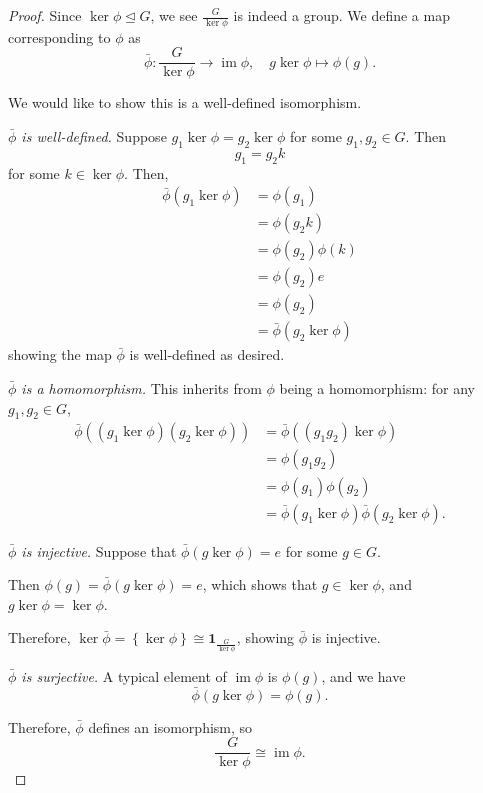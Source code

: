\documentclass{article}
\theoremstyle{definition}
\theoremstyle{remark}
\newcommand{\pqty}[1]{\left(#1\right)}
\newcommand{\Bqty}[1]{\left\{#1\right\}}
\newcommand{\flatfrac}[2]{\frac{#1}{#2}}
\newcommand{\function}[5]{#1:#2\to #3,\quad #4\mapsto #5}
\newcommand{\isomorphic}{\cong}
\newcommand{\normalsub}{\trianglelefteq}
\newcommand{\img}{\operatorname{im}}
\newcommand{\trivialgp}{\mathbf{1}}
\begin{document}
\begin{proof}
    Since \(\ker \phi \normalsub G\), we see \(\flatfrac{G}{\ker \phi}\) is indeed a group. We define a map corresponding to \(\phi\) as
    \[
        \function{\bar{\phi}}{\flatfrac{G}{\ker \phi}}{\img \phi}{g \ker \phi}{\phi \pqty{g}.}
    \]

    We would like to show this is a well-defined isomorphism.

    \emph{\(\bar{\phi}\) is well-defined.} Suppose \(g_1 \ker \phi = g_2 \ker \phi\) for some \(g_1, g_2 \in G\). Then
    \[
        g_1 = g_2 k
    \]
    for some \(k \in \ker \phi\). Then,
    \begin{align*}
            \bar{\phi} \pqty{g_1 \ker \phi} &= \phi\pqty{g_1} \\
            &= \phi\pqty{g_2 k} \\
            &= \phi\pqty{g_2} \phi\pqty{k} \\
            &= \phi\pqty{g_2} e \\
            &= \phi\pqty{g_2} \\
            &= \bar{\phi} \pqty{g_2 \ker \phi}
    \end{align*}
    showing the map \(\bar{\phi}\) is well-defined as desired.

    \emph{\(\bar{\phi}\) is a homomorphism.} This inherits from \(\phi\) being a homomorphism: for any \(g_1, g_2 \in G\),
    \begin{align*}
        \bar{\phi} \pqty{\pqty{g_1 \ker \phi} \pqty{g_2 \ker \phi}} &= \bar{\phi} \pqty{\pqty{g_1 g_2} \ker \phi} \\
        &= \phi \pqty{g_1 g_2} \\
        &= \phi \pqty{g_1} \phi \pqty{g_2} \\
        &= \bar{\phi} \pqty{g_1 \ker \phi} \bar{\phi} \pqty{g_2 \ker \phi}.
    \end{align*}

    \emph{\(\bar{\phi}\) is injective.} Suppose that \(\bar{\phi} \pqty{g \ker \phi} = e\) for some \(g \in G\).
    
    Then \(\phi\pqty{g} = \bar{\phi} \pqty{g \ker \phi} = e\), which shows that \(g \in \ker \phi\), and \(g \ker \phi = \ker \phi\).

    Therefore, \(\ker \bar{\phi} = \Bqty{\ker \phi} \isomorphic \trivialgp_{\flatfrac{G}{\ker \phi}}\), showing \(\bar{\phi}\) is injective.

    \emph{\(\bar{\phi}\) is surjective.} A typical element of \(\img \phi\) is \(\phi\pqty{g}\), and we have
    \[
        \bar{\phi} \pqty{g \ker \phi} = \phi\pqty{g}.
    \]

    Therefore, \(\bar{\phi}\) defines an isomorphism, so
    \[
        \flatfrac{G}{\ker \phi} \isomorphic \img \phi.
    \]
\end{proof}
\end{document}
